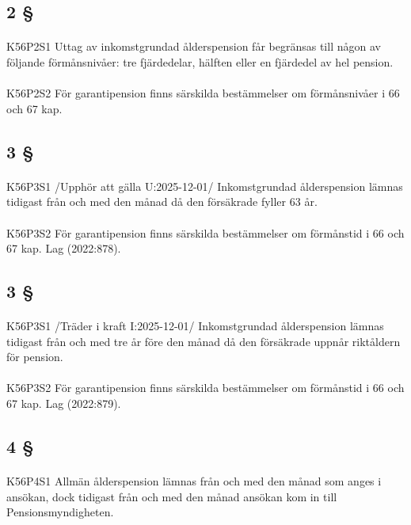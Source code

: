 \documentclass[a4paper,notitlepage,openany,10pt]{book}
\begin{document}
\subsection*{2 §}
\paragraph*{}
{\tiny K56P2S1}
Uttag av inkomstgrundad ålderspension får begränsas till någon av följande förmånsnivåer: tre fjärdedelar, hälften eller en fjärdedel av hel pension.
\paragraph*{}
{\tiny K56P2S2}
För garantipension finns särskilda bestämmelser om förmånsnivåer i 66 och 67 kap.
\subsection*{3 §}
\paragraph*{}
{\tiny K56P3S1}
/Upphör att gälla U:2025-12-01/
Inkomstgrundad ålderspension lämnas tidigast från och med den månad då den försäkrade fyller 63 år.
\paragraph*{}
{\tiny K56P3S2}
För garantipension finns särskilda bestämmelser om förmånstid i 66 och 67 kap.
Lag (2022:878).
\subsection*{3 §}
\paragraph*{}
{\tiny K56P3S1}
/Träder i kraft I:2025-12-01/
Inkomstgrundad ålderspension lämnas tidigast från och med tre år före den månad då den försäkrade uppnår riktåldern för pension.
\paragraph*{}
{\tiny K56P3S2}
För garantipension finns särskilda bestämmelser om förmånstid i 66 och 67 kap.
Lag (2022:879).
\subsection*{4 §}
\paragraph*{}
{\tiny K56P4S1}
Allmän ålderspension lämnas från och med den månad som anges i ansökan, dock tidigast från och med den månad ansökan kom in till Pensionsmyndigheten.
\end{document}
